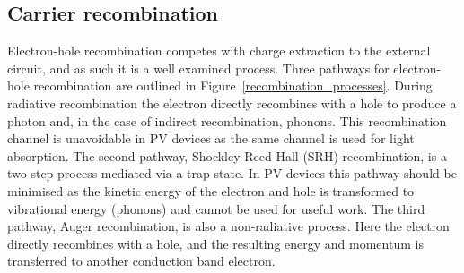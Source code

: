 

\subsection{Carrier recombination} \label{recombination}
Electron-hole recombination competes with charge extraction to the external circuit, and as such it is a well examined process. Three pathways for electron-hole recombination are outlined in Figure\ \ref{recombination_processes}. During radiative recombination the electron directly recombines with a hole to produce a photon and, in the case of indirect recombination, phonons. This recombination channel is unavoidable in PV devices as the same channel is used for light absorption. The second pathway, Shockley-Reed-Hall (SRH) recombination, is a two step process mediated via a trap state. In PV devices this pathway should be minimised as the kinetic energy of the electron and hole is transformed to vibrational energy (phonons) and cannot be used for useful work. The third pathway, Auger recombination, is also a non-radiative process. Here the electron directly recombines with a hole, and the resulting energy and momentum is transferred to another conduction band electron.

